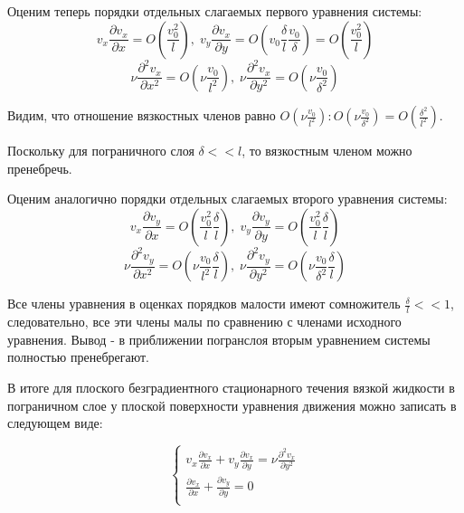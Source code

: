 Оценим теперь порядки отдельных слагаемых первого уравнения системы:
$$v_x\frac{\partial v_x}{\partial x} = O(\frac{v_0^2}{l}),\; v_y\frac{\partial v_x}{\partial y} = O(v_0\frac{\delta}{l} \frac{v_0}{\delta}) = O(\frac{v_0^2}{l})$$
$$\nu \frac{\partial^2 v_x}{\partial x^2} = O(\nu \frac{v_0}{l^2}),\; \nu \frac{\partial^2 v_x}{\partial y^2} = O(\nu \frac{v_0}{\delta^2})$$

Видим, что отношение вязкостных членов равно $O(\nu \frac{v_0}{l^2}) : O(\nu \frac{v_0}{\delta^2}) = O(\frac{\delta^2}{l^2})$.

Поскольку для пограничного слоя $\delta << l$, то вязкостным членом можно пренебречь.

\bigskip
Оценим аналогично порядки отдельных слагаемых второго уравнения системы:
$$v_x\frac{\partial v_y}{\partial x} = O(\frac{v_0^2}{l}\frac{\delta}{l}),\; v_y\frac{\partial v_y}{\partial y} = O(\frac{v_0^2}{l}\frac{\delta}{l})$$
$$\nu \frac{\partial^2 v_y}{\partial x^2} = O(\nu \frac{v_0}{l^2}\frac{\delta}{l}),\; \nu \frac{\partial^2 v_y}{\partial y^2} = O(\nu \frac{v_0}{\delta^2}\frac{\delta}{l})$$

Все члены уравнения в оценках порядков малости имеют сомножитель $\frac{\delta}{l} << 1$, следовательно, все эти члены малы по
сравнению с членами исходного уравнения. Вывод - в приближении погранслоя вторым уравнением системы полностью пренебрегают.

В итоге для плоского безградиентного стационарного течения вязкой жидкости в пограничном слое у плоской поверхности уравнения движения можно записать в следующем виде:

\begin{equation}
  \begin{cases}
    v_x\frac{\partial v_x}{\partial x} + v_y\frac{\partial v_x}{\partial y} = \nu \frac{\partial^2 v_x}{\partial y^2} \\

    \frac{\partial v_x}{\partial x} + \frac{\partial v_y}{\partial y} = 0                                             \\
  \end{cases}
\end{equation}
